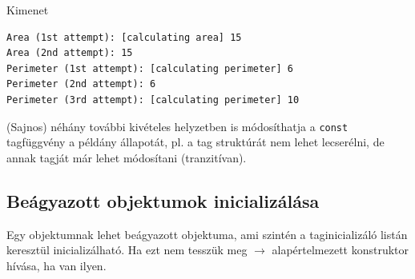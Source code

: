 \begin{frame}[fragile]
    \begin{exampleblock}{}
        \scriptsize
        \vspace{-.2cm}
        
        \vspace{-.2cm}
    \end{exampleblock}
    \begin{block}{Kimenet}
        \scriptsize
        \vspace{-.2cm}
        \begin{verbatim}
Area (1st attempt): [calculating area] 15
Area (2nd attempt): 15
Perimeter (1st attempt): [calculating perimeter] 6
Perimeter (2nd attempt): 6
Perimeter (3rd attempt): [calculating perimeter] 10
\end{verbatim}
    \vspace{-.2cm}
    \end{block}
\end{frame}

\begin{frame}
    (Sajnos) néhány további kivételes helyzetben is módosíthatja a \texttt{const} tagfüggvény a példány állapotát, pl.
    a tag struktúrát nem lehet lecserélni, de annak tagját már lehet módosítani (tranzitívan).
\end{frame}

\subsection{Beágyazott objektumok inicializálása}

\begin{frame}
    Egy objektumnak lehet beágyazott objektuma, ami szintén a taginicializáló listán keresztül inicializálható. Ha ezt nem tesszük meg $\to$ alapértelmezett konstruktor hívása, ha van ilyen.
    \begin{exampleblock}{}
        
    \end{exampleblock}
\end{frame}

\begin{frame}
    \begin{exampleblock}{}
        \scriptsize
        
    \end{exampleblock}
\end{frame}

\begin{frame}
    \begin{exampleblock}{}
        \small
        
    \end{exampleblock}
\end{frame}
